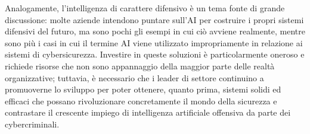 Analogamente, l'intelligenza di carattere difensivo è un tema fonte di grande discussione: molte aziende intendono puntare sull'AI per costruire
i propri sistemi difensivi del futuro, ma sono pochi gli esempi in cui ciò avviene realmente, mentre sono più i casi 
in cui il termine AI viene utilizzato impropriamente in relazione ai sistemi di cybersicurezza. Investire in queste soluzioni è particolarmente
oneroso e richiede risorse che non sono appannaggio della maggior parte delle realtà organizzative; tuttavia, è necessario che i leader di settore
continuino a promuoverne lo sviluppo per poter ottenere, quanto prima, sistemi solidi ed efficaci che possano rivoluzionare concretamente
il mondo della sicurezza e contrastare il crescente impiego di intelligenza artificiale offensiva da parte dei cybercriminali.
